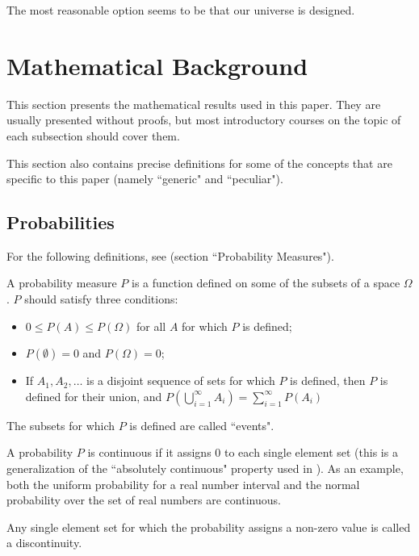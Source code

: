 \documentclass[a4paper
,draft
]{article}
\newcommand{\ghilimele}[1]{``#1"}
\begin{document}
The most reasonable option seems to be that our universe is designed.

\section{Mathematical Background}
\label{sec:background}

This section presents the mathematical results used in this paper. They are
usually presented without proofs, but most introductory courses
on the topic of each subsection should cover them.

This section also contains precise definitions for some of the concepts that
are specific to this paper
(namely \ghilimele{generic} and \ghilimele{peculiar}).

\subsection{Probabilities}
\label{sec:probabilities}

For the following definitions, see
\textcite{Billingsley1995} (section \ghilimele{Probability Measures}).

A probability measure $P$ is a function defined on some of the subsets of a
space $\Omega$. $P$ should satisfy three conditions:
\begin{itemize}
  \item $0 \le P(A) \le P(\Omega)$ for all $A$ for which $P$ is defined;
  \item $P(\emptyset) = 0$ and $P(\Omega) = 0$;
  \item If $A_1, A_2, \dots$ is a disjoint sequence of sets for which $P$ is
        defined, then $P$ is defined for their union, and
        $P(\bigcup\limits_{i=1}^{\infty} A_i)=\sum_{i=1}^{\infty}P(A_i)$
\end{itemize}

The subsets for which $P$ is defined are called \ghilimele{events}.


A probability $P$ is continuous if it assigns $0$ to each single element set
(this is a generalization of the \ghilimele{absolutely continuous} property
used in \textcite{Billingsley1995}).
As an example, both the uniform probability for a real number interval and the
normal probability over the set of real numbers are continuous.

Any single element set for which the probability assigns a non-zero value is
called a discontinuity.
\end{document}
